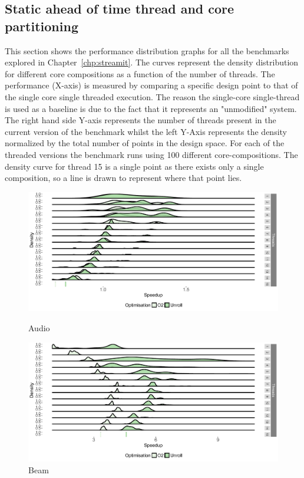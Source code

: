 \begin{appendices}
\chapter{Static ahead of time thread and core partitioning}
This section shows the performance distribution graphs for all the benchmarks explored in Chapter~\ref{chp:streamit}.
The curves represent the density distribution for different core compositions as a function of the number of threads.
The performance (X-axis) is measured by comparing a specific design point to that of the single core single threaded execution.
The reason the single-core single-thread is used as a baseline is due to the fact that it represents an "unmodified" system.
The right hand side Y-axis represents the number of threads present in the current version of the benchmark whilst the left Y-Axis represents the density normalized by the total number of points in the design space.
For each of the threaded versions the benchmark runs using 100 different core-compositions.
The density curve for thread 15 is a single point as there exists only a single composition, so a line is drawn to represent where that point lies.
\begin{figure}[t]
\center
 \includegraphics[width=1\textwidth]{streamit-paper/graphics/appendixgraphs/audio_total2.pdf}
\caption{Audio}\label{chp:stream:at}

\includegraphics[width=1\textwidth]{streamit-paper/graphics/appendixgraphs/beamformer_total2.pdf}
\caption{Beam}\label{chp:stream:bt}


\end{figure}
\end{appendices}
